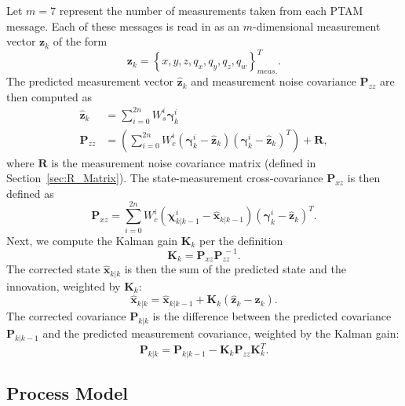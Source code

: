 Let $m = 7$ represent the number of measurements taken from each PTAM message. Each of these messages is read in as an $m$-dimensional measurement vector $\mathbf{z}_{k}$ of the form
%
\begin{equation}
\mathbf{z}_{k} = \left\lbrace x, y, z, q_{x}, q_{y}, q_{z}, q_{w} \right\rbrace ^{T} _{meas.} .
\end{equation}
%
The predicted measurement vector $\hat{\mathbf{z}}_{k}$ and measurement noise covariance $\mathbf{P}_{zz}$ are then computed as
%
\begin{align}
\hat{\mathbf{z}}_{k} &= \sum^{2n}_{i=0} W^{i}_{s} \bm{\gamma}^{i}_{k} \\
\mathbf{P}_{zz} &= \left( \sum^{2n}_{i=0} W^{i}_{c} \left( \bm{\gamma}^{i}_{k} - \hat{\mathbf{z}}_{k} \right) \left( \bm{\gamma}^{i}_{k} - \hat{\mathbf{z}}_{k} \right)^{T} \right) + \mathbf{R},
\end{align}
%
where $\mathbf{R}$ is the measurement noise covariance matrix (defined in Section~\ref{sec:R_Matrix}). The state-measurement cross-covariance $\mathbf{P}_{xz}$ is then defined as
%
\begin{equation}
\mathbf{P}_{xz} = \sum^{2n}_{i=0} W^{i}_{c} \left( \bm{\chi}^{i}_{k | k-1} - \hat{\mathbf{x}}_{k | k-1} \right) \left( \bm{\gamma}^{i}_{k} - \hat{\mathbf{z}}_{k} \right)^{T} .
\end{equation}
%
Next, we compute the Kalman gain $\mathbf{K}_{k}$ per the definition
%
\begin{equation}
\mathbf{K}_{k} = \mathbf{P}_{xz} \mathbf{P}^{\,-1}_{zz}.
\end{equation}
%
The corrected state $\hat{\mathbf{x}}_{k | k}$ is then the sum of the predicted state and the innovation, weighted by $\mathbf{K}_{k}$:
%
\begin{equation}
\hat{\mathbf{x}}_{k | k} = \hat{\mathbf{x}}_{k | k-1} + \mathbf{K}_{k} \left( \hat{\mathbf{z}}_{k} - \mathbf{z}_{k} \right) .
\end{equation}
%
The corrected covariance $\mathbf{P}_{k | k}$ is the difference between the predicted covariance $\mathbf{P}_{k | k-1}$ and the predicted measurement covariance, weighted by the Kalman gain:
%
\begin{equation}
\mathbf{P}_{k | k} = \mathbf{P}_{k | k-1} - \mathbf{K}_{k} \mathbf{P}_{zz} \mathbf{K}_{k}^{T} .
\end{equation}

\subsection{Process Model} \label{Process_Model}

